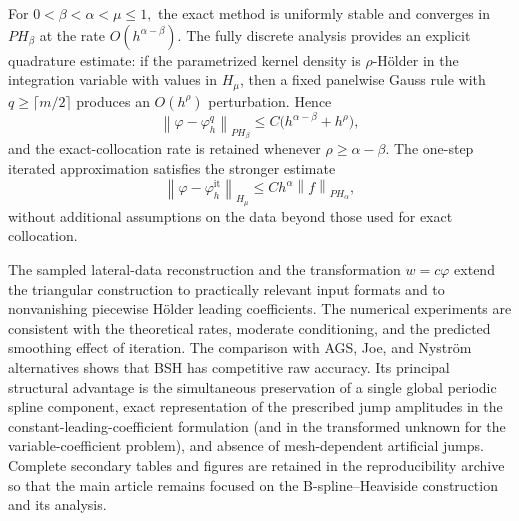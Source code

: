 \documentclass[11pt,a4paper]{amsart}
\theoremstyle{plain}
\theoremstyle{definition}
\theoremstyle{remark}
\newcommand{\norm}[1]{\left\|#1\right\|}
\begin{document}
For
$
        0<\beta<\alpha<\mu\le1,
$
the exact method is uniformly stable and converges in $PH_\beta$ at the
rate $O(h^{\alpha-\beta})$.  The fully discrete analysis provides an explicit quadrature estimate:
if the parametrized kernel density is $\rho$-H\"older in the integration
variable with values in $H_\mu$, then a fixed panelwise Gauss rule with
$q\ge\lceil m/2\rceil$ produces an $O(h^\rho)$ perturbation.  Hence
\[
        \norm{\varphi-\varphi_h^q}_{PH_\beta}
        \le
        C\bigl(h^{\alpha-\beta}+h^\rho\bigr),
\]
and the exact-collocation rate is retained whenever
$\rho\ge\alpha-\beta$.  The one-step iterated approximation satisfies the
stronger estimate
\[
        \norm{\varphi-\varphi_h^{\mathrm{it}}}_{H_\mu}
        \le
        C h^\alpha\norm{f}_{PH_\alpha},
\]
without additional assumptions on the data beyond those used for exact
collocation.

The sampled lateral-data reconstruction and the transformation
$w=c\varphi$ extend the triangular construction to practically relevant
input formats and to nonvanishing piecewise H\"older leading coefficients.
The numerical experiments are consistent with the theoretical rates,
moderate conditioning, and the predicted smoothing effect of iteration.
The comparison with AGS, Joe, and Nystr\"om alternatives shows that BSH has
competitive raw accuracy.  Its principal structural advantage is the
simultaneous preservation of a single global periodic spline component,
exact representation of the prescribed jump amplitudes in the constant-leading-coefficient formulation (and in the transformed unknown for the variable-coefficient problem), and absence of mesh-dependent artificial jumps.  Complete secondary tables and figures are retained in
the reproducibility archive so that the main article remains focused on the
B-spline--Heaviside construction and its analysis.
\end{document}
